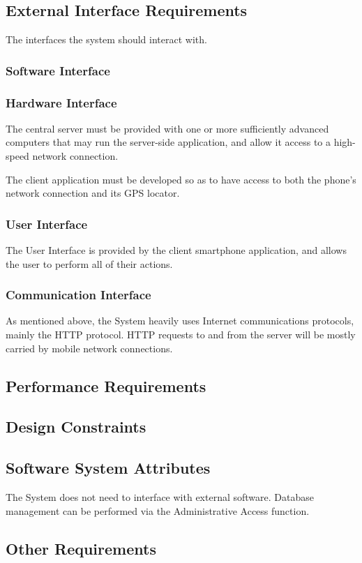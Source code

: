 \subsection{External Interface Requirements}
The interfaces the system should interact with.

\subsubsection{Software Interface}
\subsubsection{Hardware Interface}
The central server must be provided with one or more sufficiently advanced computers that may run the server-side application, and allow it access to a high-speed network connection.

The client application must be developed so as to have access to both the phone's network connection and its GPS locator.

\subsubsection{User Interface}
The User Interface is provided by the client smartphone application, and allows the user to perform all of their actions.

\subsubsection{Communication Interface}
As mentioned above, the System heavily uses Internet communications protocols, mainly the HTTP protocol. HTTP requests to and from the server will be mostly carried by mobile network connections.

\subsection{Performance Requirements}
\subsection{Design Constraints}
\subsection{Software System Attributes}
The System does not need to interface with external software. Database management can be performed via the Administrative Access function.

\subsection{Other Requirements}